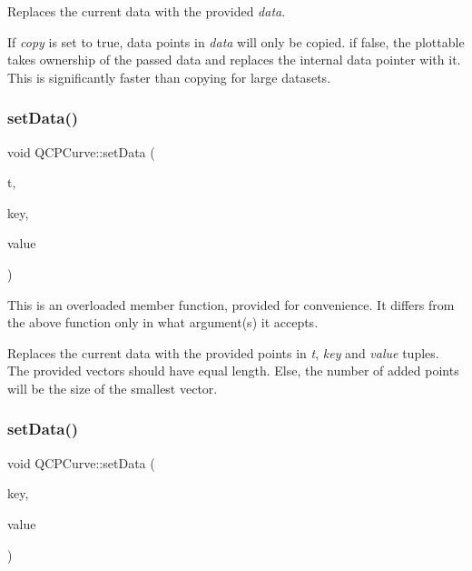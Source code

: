 Replaces the current data with the provided {\itshape data}.

If {\itshape copy} is set to true, data points in {\itshape data} will only be copied. if false, the plottable takes ownership of the passed data and replaces the internal data pointer with it. This is significantly faster than copying for large datasets. \mbox{\label{class_q_c_p_curve_affe80e011e2ced62a88f614acd6ab8d1}} 
\subsubsection{\texorpdfstring{set\+Data()}{setData()}\hspace{0.1cm}{\footnotesize\ttfamily [2/3]}}
{\footnotesize\ttfamily void Q\+C\+P\+Curve\+::set\+Data (\begin{DoxyParamCaption}\item[{const Q\+Vector$<$ double $>$ \&}]{t,  }\item[{const Q\+Vector$<$ double $>$ \&}]{key,  }\item[{const Q\+Vector$<$ double $>$ \&}]{value }\end{DoxyParamCaption})}

This is an overloaded member function, provided for convenience. It differs from the above function only in what argument(s) it accepts.

Replaces the current data with the provided points in {\itshape t}, {\itshape key} and {\itshape value} tuples. The provided vectors should have equal length. Else, the number of added points will be the size of the smallest vector. \mbox{\label{class_q_c_p_curve_a963d4c45777deef15848a8f56172d066}} 
\subsubsection{\texorpdfstring{set\+Data()}{setData()}\hspace{0.1cm}{\footnotesize\ttfamily [3/3]}}
{\footnotesize\ttfamily void Q\+C\+P\+Curve\+::set\+Data (\begin{DoxyParamCaption}\item[{const Q\+Vector$<$ double $>$ \&}]{key,  }\item[{const Q\+Vector$<$ double $>$ \&}]{value }\end{DoxyParamCaption})}

